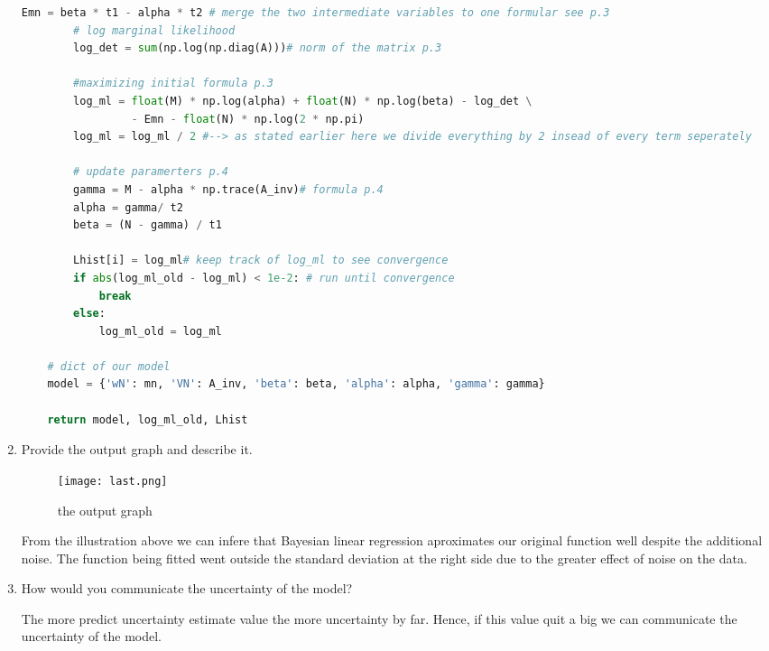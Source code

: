 \documentclass{homework}
\begin{document}
\begin{enumerate}
\begin{lstlisting}[language=Python, caption=DT Bayes Linear Regression, basicstyle=\tiny]
        Emn = beta * t1 - alpha * t2 # merge the two intermediate variables to one formular see p.3
        # log marginal likelihood
        log_det = sum(np.log(np.diag(A)))# norm of the matrix p.3
        
        #maximizing initial formula p.3
        log_ml = float(M) * np.log(alpha) + float(N) * np.log(beta) - log_det \
                 - Emn - float(N) * np.log(2 * np.pi)
        log_ml = log_ml / 2 #--> as stated earlier here we divide everything by 2 insead of every term seperately

        # update paramerters p.4
        gamma = M - alpha * np.trace(A_inv)# formula p.4
        alpha = gamma/ t2
        beta = (N - gamma) / t1

        Lhist[i] = log_ml# keep track of log_ml to see convergence
        if abs(log_ml_old - log_ml) < 1e-2: # run until convergence
            break
        else:
            log_ml_old = log_ml

    # dict of our model 
    model = {'wN': mn, 'VN': A_inv, 'beta': beta, 'alpha': alpha, 'gamma': gamma}

    return model, log_ml_old, Lhist
		\end{lstlisting}
	\item Provide the output graph and describe it.
	\newpage
	\begin{figure}[hbt!]
		\centering
		\texttt{[image: last.png]}
		\caption{the output graph}
	\end{figure}
	
	From the illustration above we can infere that Bayesian linear regression aproximates our original function well despite the additional noise. The function being fitted went outside the standard deviation at the right side due to the greater effect of noise on the data.
	\item How would you communicate the uncertainty of the model?
	
		The more predict uncertainty estimate value the more uncertainty by far. Hence, if this value quit a big we can  communicate the uncertainty of the model.
\end{enumerate}
\end{document}
